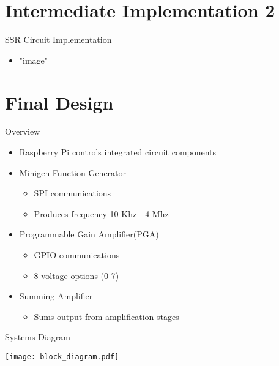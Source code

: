 \section{Intermediate Implementation 2}

\begin{frame}{SSR Circuit Implementation}
  \begin{itemize}
    \item "image"
  \end{itemize}
\end{frame}

\section{Final Design}

\begin{frame}{Overview}
\begin{block}{}
  \begin{itemize}
    \item Raspberry Pi controls integrated circuit components
    \item Minigen Function Generator
    \begin{itemize}
      \item SPI communications
      \item Produces frequency 10 Khz - 4 Mhz
    \end{itemize}
     \item Programmable Gain Amplifier(PGA)
    \begin{itemize}
      \item GPIO communications
      \item 8 voltage options (0-7)
    \end{itemize}
    \item Summing Amplifier
    \begin{itemize}
      \item Sums output from amplification stages
    \end{itemize}
  \end{itemize}
\end{block}
\end{frame}

\begin{frame}{Systems Diagram}
  \begin{center}
  \texttt{[image: block\_diagram.pdf]}
  \end{center}
\end{frame}

